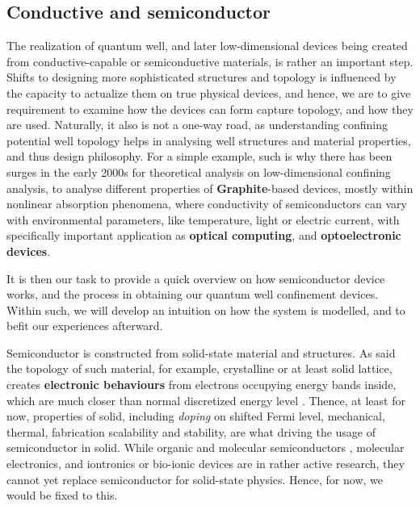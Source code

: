 \documentclass[%
 reprint,
 amsmath,amssymb,
 aps,
]{revtex4-2}
\begin{document}
\subsection{Conductive and semiconductor}

The realization of quantum well, and later low-dimensional devices being created from conductive-capable or semiconductive materials, is rather an important step. Shifts to designing more sophisticated structures and topology is influenced by the capacity to actualize them on true physical devices, and hence, we are to give requirement to examine how the devices can form capture topology, and how they are used. Naturally, it also is not a one-way road, as understanding confining potential well topology helps in analysing well structures and material properties, and thus design philosophy. For a simple example, such is why there has been surges in the early 2000s for theoretical analysis on low-dimensional confining analysis, to analyse different properties of \textbf{Graphite}-based devices, mostly within nonlinear absorption phenomena, where conductivity of semiconductors can vary with environmental parameters, like temperature, light or electric current, with specifically important application as \textbf{optical computing}, and \textbf{optoelectronic devices}. 

It is then our task to provide a quick overview on how semiconductor device works, and the process in obtaining our quantum well confinement devices. Within such, we will develop an intuition on how the system is modelled, and to befit our experiences afterward. 

Semiconductor is constructed from solid-state material and structures. As said the topology of such material, for example, crystalline or at least solid lattice, creates \textbf{electronic behaviours} from electrons occupying energy bands inside, which are much closer than normal discretized energy level \cite{huang2DSemiconductorsSpecific2022}. Thence, at least for now, properties of solid, including \textit{doping} on shifted Fermi level, mechanical, thermal, fabrication scalability and stability, are what driving the usage of semiconductor in solid. While organic and molecular semiconductors \cite{FACCHETTI200728}, molecular electronics, and iontronics or bio-ionic devices are in rather active research, they cannot yet replace semiconductor for solid-state physics. Hence, for now, we would be fixed to this. 
\end{document}
